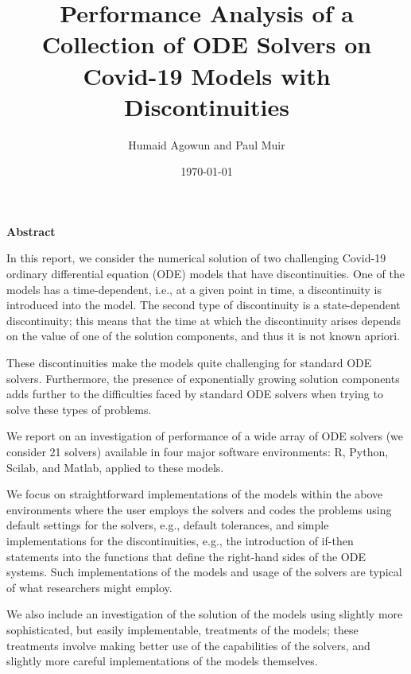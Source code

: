 \documentclass{article}
\begin{document}
\begin{titlepage}
\author{Humaid Agowun and Paul Muir} 
\title{Performance Analysis of a Collection of ODE Solvers on Covid-19 Models with Discontinuities 
} 
\date{\today} 
\maketitle
\end{titlepage}

\begin{center}
    \textbf{Abstract}
\end{center}

In this report, we consider the numerical solution of two challenging
Covid-19 ordinary differential equation (ODE) 
models that have discontinuities. One of the models has a 
time-dependent, i.e., at a given point in time, a discontinuity is introduced
into the model. The second type of discontinuity is a state-dependent discontinuity;
this means that the time at which the discontinuity arises depends on the
value of one of the solution components, and thus it is not known apriori.

These discontinuities make the models quite challenging for standard ODE solvers.
Furthermore, the presence of exponentially growing solution components adds further
to the difficulties faced by standard ODE solvers when trying to solve these types of 
problems.

We report on an investigation of performance of a wide array of ODE solvers (we
consider 21 solvers) available in four major software environments: R, Python, 
Scilab, and Matlab, applied to these models.

We focus on straightforward implementations of the models within the above environments
where the user employs the solvers and codes the problems using default settings for 
the solvers, e.g., default tolerances, and simple implementations for the
discontinuities, e.g., the introduction of if-then statements into the functions that 
define the right-hand sides of the ODE systems. Such implementations of the models
and usage of the solvers are typical of what researchers might employ.

We also include an investigation of the solution of the models using slightly more
sophisticated, but easily implementable, treatments of the models; these treatments
involve making better use of the capabilities of the solvers, and slightly more careful
implementations of the models themselves.
\end{document}
